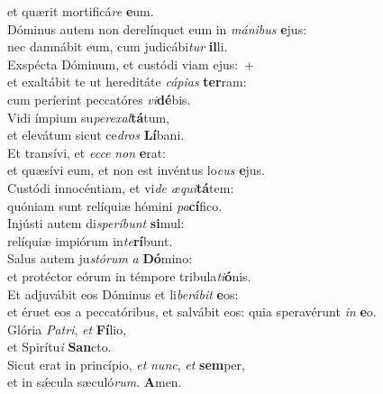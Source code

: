 \evenverse et quærit mortificá\textit{re} \textbf{e}um.\\
\oddverse Dóminus autem non derelínquet eum in \textit{má}\textit{ni}\textit{bus} \textbf{e}jus:~\*\\
\oddverse nec damnábit eum, cum judicábi\textit{tur} \textbf{il}li.\\
\evenverse Exspécta Dóminum, et custódi viam ejus:~+\\
\evenverse  et exaltábit te ut hereditáte \textit{cá}\textit{pi}\textit{as} \textbf{ter}ram:~\*\\
\evenverse cum períerint peccatóres \textit{vi}\textbf{dé}bis.\\
\oddverse Vidi ímpium su\textit{pe}\textit{re}\textit{xal}\textbf{tá}tum,~\*\\
\oddverse et elevátum sicut ce\textit{dros} \textbf{Lí}bani.\\
\evenverse Et transívi, et \textit{ec}\textit{ce} \textit{non} \textbf{e}rat:~\*\\
\evenverse et quæsívi eum, et non est invéntus lo\textit{cus} \textbf{e}jus.\\
\oddverse Custódi innocéntiam, et vi\textit{de} \textit{æ}\textit{qui}\textbf{tá}tem:~\*\\
\oddverse quóniam sunt relíquiæ hómini \textit{pa}\textbf{cí}fico.\\
\evenverse Injústi autem di\textit{spe}\textit{rí}\textit{bunt} \textbf{si}mul:~\*\\
\evenverse relíquiæ impiórum in\textit{te}\textbf{rí}bunt.\\
\oddverse Salus autem ju\textit{stó}\textit{rum} \textit{a} \textbf{Dó}mino:~\*\\
\oddverse et protéctor eórum in témpore tribula\textit{ti}\textbf{ó}nis.\\
\evenverse Et adjuvábit eos Dóminus et li\textit{be}\textit{rá}\textit{bit} \textbf{e}os:~\*\\
\evenverse et éruet eos a peccatóribus, et salvábit eos: quia speravérunt \textit{in} \textbf{e}o.\\
\oddverse Glória \textit{Pa}\textit{tri}, \textit{et} \textbf{Fí}lio,~\*\\
\oddverse et Spirítu\textit{i} \textbf{San}cto.\\
\evenverse Sicut erat in princípio, \textit{et} \textit{nunc}, \textit{et} \textbf{sem}per,~\*\\
\evenverse et in sǽcula sæculó\textit{rum}. \textbf{A}men.\\
